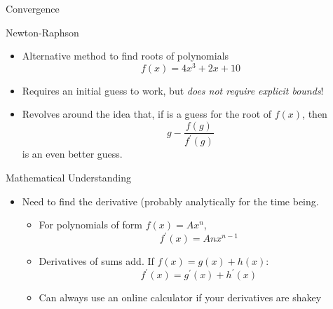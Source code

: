 \documentclass[pdf, aspectratio=169, 12pt]{beamer}
\begin{document}
\begin{frame}{Convergence}
	\begin{center}
	\end{center}
\end{frame}

\begin{frame}{Newton-Raphson}
	\begin{itemize}
		\item Alternative method to find roots of polynomials
			\[f(x) = 4x^3 + 2x + 10\]
		\item Requires an initial guess to work, but \emph{does not require explicit bounds}!
		\item Revolves around the idea that, if  is a guess for the root of $f(x)$, then
			\[g - \frac{f(g)}{f^\prime(g)}\]
			is an even better guess.
	\end{itemize}
\end{frame}

\begin{frame}{Mathematical Understanding}
	\begin{itemize}
		\item Need to find the derivative (probably analytically for the time being.
			\begin{itemize}
				\item For polynomials of form $f(x) = Ax^n$,
					\[f^\prime(x) = Anx^{n-1}\]
				\item Derivatives of sums add. If $f(x) = g(x) + h(x)$:
					\[f^\prime(x) = g^\prime(x) + h^\prime(x)\]
				\item Can always use an online calculator if your derivatives are shakey
			\end{itemize}
	\end{itemize}
\end{frame}
\end{document}
